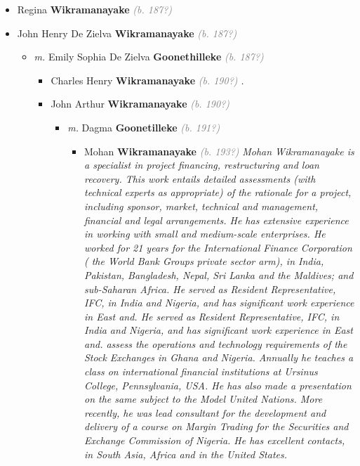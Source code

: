 \documentclass[10pt, openany]{book}
\begin{document}
\begin{itemize}
{\begin{itemize}
\item{Regina \textbf{Wikramanayake} \textcolor{gray}{\textit{(b. 187?)}}
 }
\item{John Henry De Zielva \textbf{Wikramanayake} \textcolor{gray}{\textit{(b. 187?)}}
\begin{itemize}
\item{\textit{m.} Emily Sophia De Zielva \textbf{Goonethilleke} \textcolor{gray}{\textit{(b. 187?)}}   \label{couple:00003757:00003758} \begin{itemize}
\item{Charles Henry \textbf{Wikramanayake} \textcolor{gray}{\textit{(b. 190?)}} \textcolor{slmaroon}{\textit{.}}
  }
\item{John Arthur \textbf{Wikramanayake} \textcolor{gray}{\textit{(b. 190?)}}
\begin{itemize}
\item{\textit{m.} Dagma \textbf{Goonetilleke} \textcolor{gray}{\textit{(b. 191?)}}   \label{couple:00003760:00003867} \begin{itemize}
\item{Mohan \textbf{Wikramanayake} \textcolor{gray}{\textit{(b. 193?)}} \textcolor{slmaroon}{\textit{Mohan Wikramanayake is a specialist in project financing, restructuring and loan recovery. This work entails detailed assessments (with technical experts as appropriate) of the rationale for a project, including sponsor, market, technical and management, financial and legal arrangements. He has extensive experience in working with small and medium-scale enterprises. He worked for 21 years for the International Finance Corporation ( the World Bank Groups private sector arm), in India, Pakistan, Bangladesh, Nepal, Sri Lanka and the Maldives; and sub-Saharan Africa.
He served as Resident Representative, IFC, in India and Nigeria, and has significant work experience in East and.
He served as Resident Representative, IFC, in India and Nigeria, and has significant work experience in East and.
assess the operations and technology requirements of the Stock Exchanges in Ghana and Nigeria. Annually he teaches a class on international financial institutions at Ursinus College, Pennsylvania, USA. He has also made a presentation on the same subject to the Model United Nations. More recently, he was lead consultant for the development and delivery of a course on Margin Trading for the Securities and Exchange Commission of Nigeria. He has excellent contacts, in South Asia, Africa and in the United States.}}
}
\end{itemize}}
\end{itemize}}
\end{itemize}}
\end{itemize}}
\end{itemize}}
\end{itemize}
\end{document}
